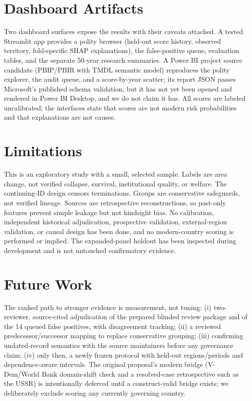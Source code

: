 \documentclass[conference]{IEEEtran}
\begin{document}
\section{Dashboard Artifacts}
Two dashboard surfaces expose the results with their caveats attached. A tested
Streamlit app provides a polity browser (held-out score history, observed
territory, fold-specific SHAP explanations), the false-positive queue, evaluation
tables, and the separate 50-year research summaries. A Power BI project source
candidate (PBIP/PBIR with TMDL semantic model) reproduces the polity explorer,
the audit queue, and a score-by-year scatter; its report JSON passes Microsoft's
published schema validation, but it has not yet been opened and rendered in Power
BI Desktop, and we do not claim it has. All scores are labeled uncalibrated; the
interfaces state that scores are not modern risk probabilities and that
explanations are not causes.

\section{Limitations}
This is an exploratory study with a small, selected sample. Labels are area
change, not verified collapse, survival, institutional quality, or welfare. The
continuing-ID design censors terminations. Groups are conservative safeguards,
not verified lineage. Sources are retrospective reconstructions, so past-only
features prevent simple leakage but not hindsight bias. No calibration,
independent historical adjudication, prospective validation, external-region
validation, or causal design has been done, and no modern-country scoring is
performed or implied. The expanded-panel holdout has been inspected during
development and is not untouched confirmatory evidence.

\section{Future Work}
The ranked path to stronger evidence is measurement, not tuning: (i) two-reviewer,
source-cited adjudication of the prepared blinded review package and of the 14
queued false positives, with disagreement tracking; (ii) a reviewed
predecessor/successor mapping to replace conservative grouping; (iii) confirming
undated-record semantics with the source maintainers before any governance claim;
(iv) only then, a newly frozen protocol with held-out regions/periods and
dependence-aware intervals. The original proposal's modern bridge (V-Dem/World
Bank domain-shift check and a resolved-case retrospective such as the USSR) is
intentionally deferred until a construct-valid bridge exists; we deliberately
exclude scoring any currently governing country.
\end{document}
